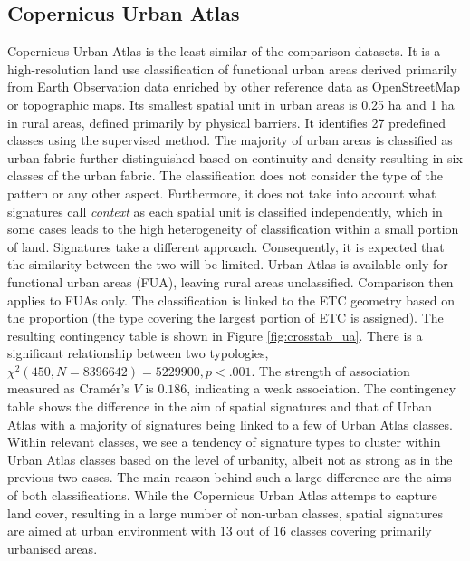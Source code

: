 \subsection*{Copernicus Urban Atlas}
Copernicus Urban Atlas is the least similar of the comparison datasets. It is a
high-resolution land use classification of functional urban areas derived primarily from
Earth Observation data enriched by other reference data as OpenStreetMap or topographic
maps. Its smallest spatial unit in urban areas is 0.25 ha and 1 ha in rural areas,
defined primarily by physical barriers. It identifies
27 predefined classes using the supervised method.
The majority of urban areas is classified as urban fabric further distinguished based on
continuity and density resulting in six classes of the urban fabric. The classification does
not consider the type of the pattern or any other aspect. Furthermore, it does not take
into account what signatures call \textit{context} as each spatial unit is
classified independently, which in some cases leads to the high heterogeneity of
classification within a small portion of land. Signatures take a different approach.
Consequently, it is expected that the similarity between the two will be limited.
Urban Atlas is available only for functional urban areas (FUA), leaving rural areas
unclassified. Comparison then applies to FUAs only. The classification is linked to the
ETC geometry based on the proportion (the type covering the largest portion of ETC is
assigned). The resulting contingency table is shown in Figure \ref{fig:crosstab_ua}. There is a
significant relationship between two typologies, $\chi^{2} (450, N = 8396642) = 5229900,
p < .001$. The strength of association measured as Cramér's $V$ is $0.186$, indicating
a weak association. The contingency table shows the difference in the aim of spatial
signatures and that of Urban Atlas with a majority of signatures being linked to a few
of Urban Atlas classes. Within relevant classes, we see a tendency of signature types to
cluster within Urban Atlas classes based on the level of urbanity, albeit not as strong
as in the previous two cases.
The main reason behind such a large difference are the aims of both classifications. While
the Copernicus Urban Atlas attemps to capture land cover, resulting in a large number
of non-urban classes, spatial signatures are aimed at urban environment with 13 out of 16
classes covering primarily urbanised areas.


